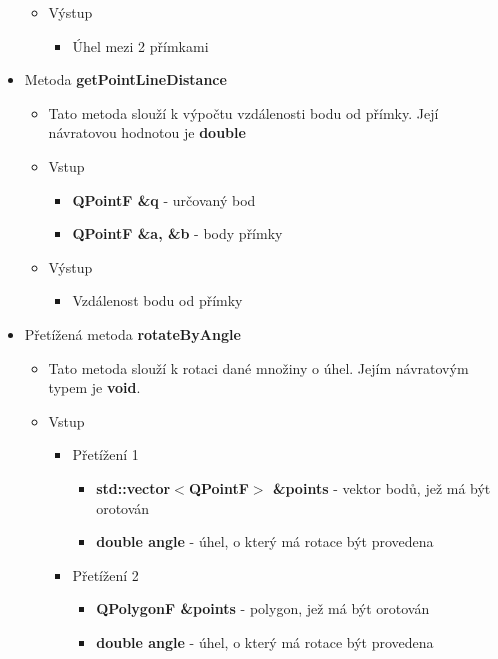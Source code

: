 \documentclass[a4paper, 12pt]{article}
\begin{document}
\begin{itemize}
\begin{itemize}
			\item Výstup
				\begin{itemize}
					\item Úhel mezi 2 přímkami
				\end{itemize}			
		\end{itemize}

	\item Metoda \textbf{getPointLineDistance}
		\begin{itemize}
			\item Tato metoda slouží k výpočtu vzdálenosti bodu od přímky. Její návratovou hodnotou je \textbf {double} %
			\item Vstup
				\begin{itemize}
					\item \textbf{QPointF \&q} - určovaný bod
					\item \textbf{QPointF \&a, \&b} - body přímky
				\end{itemize}
			\item Výstup
				\begin{itemize}
					\item Vzdálenost bodu od přímky
				\end{itemize}
		\end{itemize}

	\item Přetížená metoda \textbf{rotateByAngle}
		\begin{itemize}
			\item Tato metoda slouží k rotaci dané množiny o úhel. Jejím návratovým typem je \textbf{void}.
			\item Vstup
				\begin{itemize}
					\item Přetížení 1
						\begin{itemize}
							\item \textbf{std::vector$<$QPointF$>$ \&points} - vektor bodů, jež má být orotován
							\item \textbf{double angle} - úhel, o který má rotace být provedena
 						\end{itemize}
					
					\item Přetížení 2
						\begin{itemize}
							\item \textbf{QPolygonF \&points} - polygon, jež má být orotován
							\item \textbf{double angle} - úhel, o který má rotace být provedena
 						\end{itemize}


\end{itemize}
\end{itemize}
\end{itemize}
\end{document}
